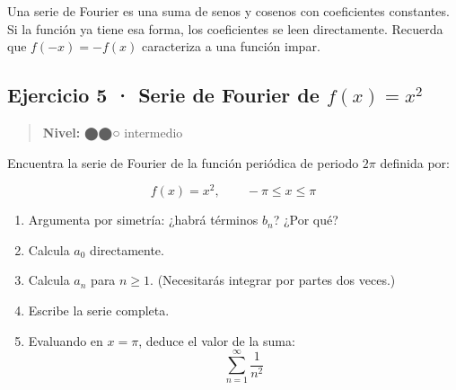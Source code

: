 \documentclass[
  letterpaper,
  DIV=11,
  numbers=noendperiod]{scrreprt}
\providecommand{\tightlist}{%
  \setlength{\itemsep}{0pt}\setlength{\parskip}{0pt}}
\begin{document}
\begin{tcolorbox}[enhanced jigsaw, colbacktitle=quarto-callout-tip-color!10!white, toptitle=1mm, titlerule=0mm, rightrule=.15mm, colframe=quarto-callout-tip-color-frame, leftrule=.75mm, breakable, colback=white, bottomrule=.15mm, coltitle=black, bottomtitle=1mm, title=\textcolor{quarto-callout-tip-color}{\faLightbulb}\hspace{0.5em}{Pista}, arc=.35mm, toprule=.15mm, left=2mm, opacitybacktitle=0.6, opacityback=0]

Una serie de Fourier es una suma de senos y cosenos con coeficientes
constantes. Si la función ya tiene esa forma, los coeficientes se leen
directamente. Recuerda que \(f(-x) = -f(x)\) caracteriza a una función
impar.

\end{tcolorbox}

\subsection*{\texorpdfstring{Ejercicio 5 · Serie de Fourier de
\(f(x) = x^2\)}{Ejercicio 5 · Serie de Fourier de f(x) = x\^{}2}}\label{ejercicio-5-serie-de-fourier-de-fx-x2}

\begin{quote}
\textbf{Nivel:} ⬤⬤○ intermedio
\end{quote}

Encuentra la serie de Fourier de la función periódica de periodo
\(2\pi\) definida por:

\[
f(x) = x^2, \qquad -\pi \le x \le \pi
\]

\begin{enumerate}
\def\labelenumi{\alph{enumi})}
\tightlist
\item
  Argumenta por simetría: ¿habrá términos \(b_n\)? ¿Por qué?
\item
  Calcula \(a_0\) directamente.
\item
  Calcula \(a_n\) para \(n \ge 1\). (Necesitarás integrar por partes dos
  veces.)
\item
  Escribe la serie completa.
\item
  Evaluando en \(x = \pi\), deduce el valor de la suma: \[
  \sum_{n=1}^{\infty} \frac{1}{n^2}
  \]
\end{enumerate}
\end{document}
